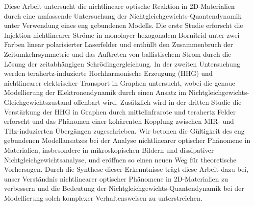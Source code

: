 \documentclass[a4paper, twoside]{NUSThesis}
\begin{document}
{\begin{abstraktum}
	Diese Arbeit untersucht die nichtlineare optische Reaktion in 2D-Materialien durch eine umfassende Untersuchung der Nichtgleichgewichts-Quantendynamik unter Verwendung eines eng gebundenen Modells. Die erste Studie erforscht die Injektion nichtlinearer Ströme in monolayer hexagonalem Bornitrid unter zwei Farben linear polarisierter Laserfelder und enthüllt den Zusammenbruch der Zeitumkehrsymmetrie und das Auftreten von ballistischem Strom durch die Lösung der zeitabhängigen Schrödingergleichung. In der zweiten Untersuchung werden terahertz-induzierte Hochharmonische Erzeugung (HHG) und nichtlinearer elektrischer Transport in Graphen untersucht, wobei die genaue Modellierung der Elektronendynamik durch einen Ansatz im Nichtgleichgewichts-Gleichgewichtszustand offenbart wird. Zusätzlich wird in der dritten Studie die Verstärkung der HHG in Graphen durch mittelinfrarote und terahertz Felder erforscht und das Phänomen einer kohärenten Kopplung zwischen MIR- und THz-induzierten Übergängen zugeschrieben. Wir betonen die Gültigkeit des eng gebundenen Modellansatzes bei der Analyse nichtlinearer optischer Phänomene in Materialien, insbesondere in mikroskopischen Bildern und dissipativer Nichtgleichgewichtsanalyse, und eröffnen so einen neuen Weg für theoretische Vorhersagen. Durch die Synthese dieser Erkenntnisse trägt diese Arbeit dazu bei, unser Verständnis nichtlinearer optischer Phänomene in 2D-Materialien zu verbessern und die Bedeutung der Nichtgleichgewichts-Quantendynamik bei der Modellierung solch komplexer Verhaltensweisen zu unterstreichen.
\end{abstraktum}
\listoftables
\listoffigures
}
\printglossary[type=symbols, style=long, title={List of Abbreviations}]
\mainmatter
%






\appendix


%
\backmatter
\begingroup
\onehalfspacing
\printbibliography[heading=bibintoc]
\endgroup
\end{document}
